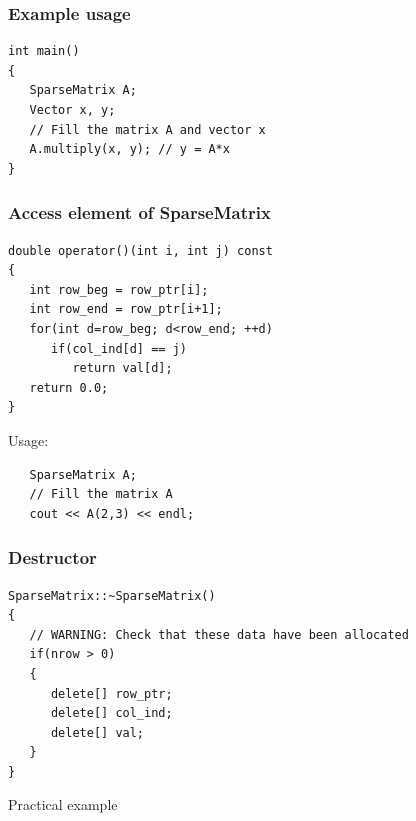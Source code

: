 \documentclass[10pt,xcolor=svgnames]{beamer}
\begin{document}
\begin{frame}[fragile]
\frametitle{Example usage}

\begin{lstlisting}
int main()
{
   SparseMatrix A;
   Vector x, y;
   // Fill the matrix A and vector x
   A.multiply(x, y); // y = A*x
}
\end{lstlisting}

\end{frame}
\begin{frame}[fragile]
\frametitle{Access element of SparseMatrix}

\begin{lstlisting}
double operator()(int i, int j) const
{
   int row_beg = row_ptr[i];
   int row_end = row_ptr[i+1];
   for(int d=row_beg; d<row_end; ++d)
      if(col_ind[d] == j) 
         return val[d];
   return 0.0;
}
\end{lstlisting}
Usage:
\begin{lstlisting}
   SparseMatrix A;
   // Fill the matrix A
   cout << A(2,3) << endl;
\end{lstlisting}

\end{frame}
\begin{frame}[fragile]
\frametitle{Destructor}

\begin{lstlisting}
SparseMatrix::~SparseMatrix()
{
   // WARNING: Check that these data have been allocated
   if(nrow > 0)
   {
      delete[] row_ptr;
      delete[] col_ind;
      delete[] val;
   }
}
\end{lstlisting}

\end{frame}
\begin{frame}

\begin{center}
\Huge Practical example
\end{center}

\end{frame}
\end{document}
